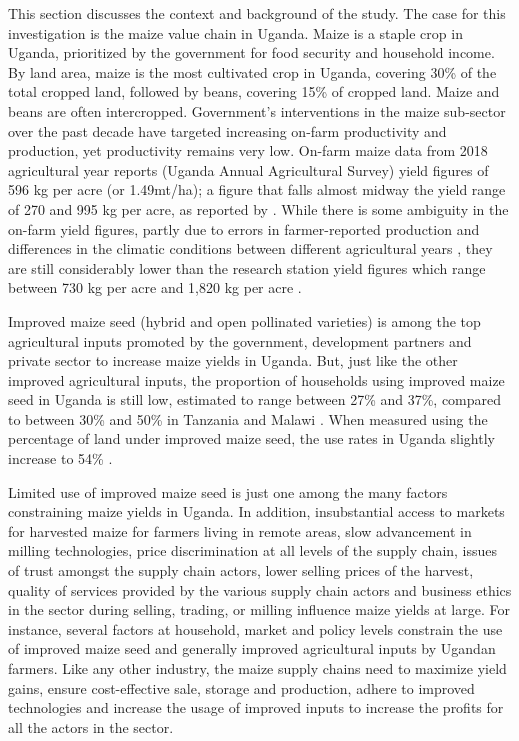 \documentclass[12pt,english]{article}\usepackage[]{graphicx}\usepackage[]{color}
\begin{document}
\begin{onehalfspace}
This section discusses the context and background of the study. The
case for this investigation is the maize value chain in Uganda. Maize
is a staple crop in Uganda, prioritized by the government for food
security and household income. By land area, maize is the most cultivated
crop in Uganda, covering 30\% of the total cropped land, followed
by beans, covering 15\% of cropped land. Maize and beans are often
intercropped. Government\textquoteright s interventions in the maize
sub-sector over the past decade have targeted increasing on-farm productivity
and production, yet productivity remains very low. On-farm maize data
from 2018 agricultural year reports (Uganda Annual Agricultural Survey)
yield figures of 596 kg per acre (or 1.49mt/ha); a figure that falls
almost midway the yield range of 270 and 995 kg per acre, as reported
by \citet{Gourlay2019}. While there is some ambiguity in the on-farm
yield figures, partly due to errors in farmer-reported production
\citep{Gourlay2019} and differences in the climatic conditions between
different agricultural years \citep{VanCampenhout2020}, they are
still considerably lower than the research station yield figures which
range between 730 kg per acre and 1,820 kg per acre \citep{Fermont2011}.

Improved maize seed (hybrid and open pollinated varieties) is among
the top agricultural inputs promoted by the government, development
partners and private sector to increase maize yields in Uganda. But,
just like the other improved agricultural inputs, the proportion of
households using improved maize seed in Uganda is still low, estimated
to range between 27\% and 37\%, compared to between 30\% and 50\%
in Tanzania and Malawi \citep{VanCampenhout2020}. When measured using
the percentage of land under improved maize seed, the use rates in
Uganda slightly increase to 54\% \citep{Sheahan2017}. 

Limited use of improved maize seed is just one among the many factors
constraining maize yields in Uganda. In addition, insubstantial access
to markets for harvested maize for farmers living in remote areas,
slow advancement in milling technologies, price discrimination at
all levels of the supply chain, issues of trust amongst the supply
chain actors, lower selling prices of the harvest, quality of services
provided by the various supply chain actors and business ethics in
the sector during selling, trading, or milling influence maize yields
at large. For instance, several factors at household, market and policy
levels constrain the use of improved maize seed and generally improved
agricultural inputs by Ugandan farmers. Like any other industry, the
maize supply chains need to maximize yield gains, ensure cost-effective
sale, storage and production, adhere to improved technologies and
increase the usage of improved inputs to increase the profits for
all the actors in the sector. 
\end{onehalfspace}
\end{document}
